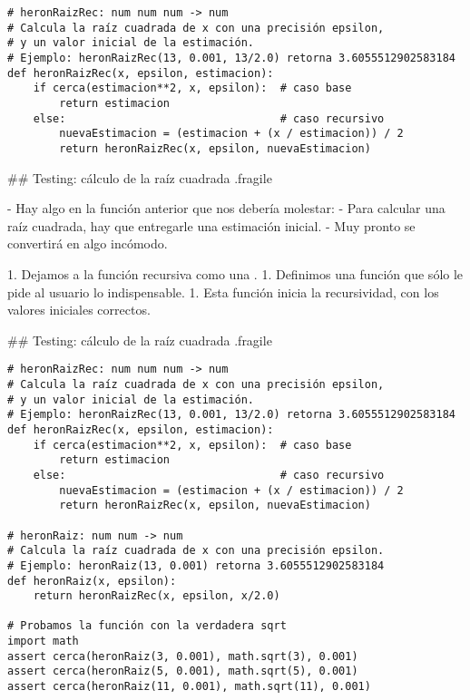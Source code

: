 \pause

\begin{lstlisting}[style=frame02]
# heronRaizRec: num num num -> num
# Calcula la raíz cuadrada de x con una precisión epsilon,
# y un valor inicial de la estimación.
# Ejemplo: heronRaizRec(13, 0.001, 13/2.0) retorna 3.6055512902583184
def heronRaizRec(x, epsilon, estimacion):
    if cerca(estimacion**2, x, epsilon):  # caso base
        return estimacion
    else:                                 # caso recursivo
        nuevaEstimacion = (estimacion + (x / estimacion)) / 2
        return heronRaizRec(x, epsilon, nuevaEstimacion)
\end{lstlisting}

## Testing: cálculo de la raíz cuadrada {.fragile}

- Hay algo en la función anterior que nos debería molestar: \pause
- Para calcular una raíz cuadrada, hay que entregarle una estimación inicial.
    - Muy pronto se convertirá en algo incómodo.

\pause

\bgnblockidea
\raggedright

1. Dejamos a la función recursiva como una .
1. Definimos una función que sólo le pide al usuario lo indispensable.
1. Esta función inicia la recursividad, con los valores iniciales correctos.

\trmblockidea

## Testing: cálculo de la raíz cuadrada {.fragile}

\begin{lstlisting}[style=frame03]
# heronRaizRec: num num num -> num
# Calcula la raíz cuadrada de x con una precisión epsilon,
# y un valor inicial de la estimación.
# Ejemplo: heronRaizRec(13, 0.001, 13/2.0) retorna 3.6055512902583184
def heronRaizRec(x, epsilon, estimacion):
    if cerca(estimacion**2, x, epsilon):  # caso base
        return estimacion
    else:                                 # caso recursivo
        nuevaEstimacion = (estimacion + (x / estimacion)) / 2
        return heronRaizRec(x, epsilon, nuevaEstimacion)

# heronRaiz: num num -> num
# Calcula la raíz cuadrada de x con una precisión epsilon.
# Ejemplo: heronRaiz(13, 0.001) retorna 3.6055512902583184
def heronRaiz(x, epsilon):
    return heronRaizRec(x, epsilon, x/2.0)

# Probamos la función con la verdadera sqrt
import math
assert cerca(heronRaiz(3, 0.001), math.sqrt(3), 0.001)
assert cerca(heronRaiz(5, 0.001), math.sqrt(5), 0.001)
assert cerca(heronRaiz(11, 0.001), math.sqrt(11), 0.001)
\end{lstlisting}

